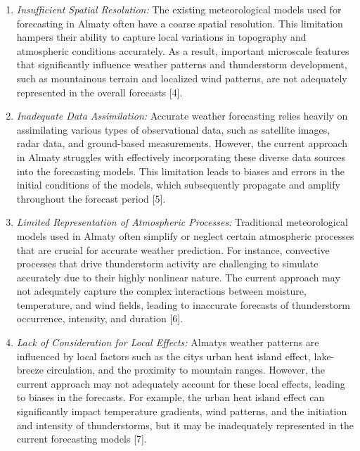 \begin{enumerate}
\def\labelenumi{\arabic{enumi})}
\item
  \emph{Insufficient Spatial Resolution:} The existing meteorological
  models used for forecasting in Almaty often have a coarse spatial
  resolution. This limitation hampers their ability to capture local
  variations in topography and atmospheric conditions accurately. As a
  result, important microscale features that significantly influence
  weather patterns and thunderstorm development, such as mountainous
  terrain and localized wind patterns, are not adequately represented in
  the overall forecasts {[}4{]}.
\item
  \emph{Inadequate Data Assimilation:} Accurate weather forecasting
  relies heavily on assimilating various types of observational data,
  such as satellite images, radar data, and ground-based measurements.
  However, the current approach in Almaty struggles with effectively
  incorporating these diverse data sources into the forecasting models.
  This limitation leads to biases and errors in the initial conditions
  of the models, which subsequently propagate and amplify throughout the
  forecast period {[}5{]}.
\item
  \emph{Limited Representation of Atmospheric Processes:} Traditional
  meteorological models used in Almaty often simplify or neglect certain
  atmospheric processes that are crucial for accurate weather
  prediction. For instance, convective processes that drive thunderstorm
  activity are challenging to simulate accurately due to their highly
  nonlinear nature. The current approach may not adequately capture the
  complex interactions between moisture, temperature, and wind fields,
  leading to inaccurate forecasts of thunderstorm occurrence, intensity,
  and duration {[}6{]}.
\item
  \emph{Lack of Consideration for Local Effects:}
  Almaty\textquotesingle s weather patterns are influenced by local
  factors such as the city\textquotesingle s urban heat island effect,
  lake-breeze circulation, and the proximity to mountain ranges.
  However, the current approach may not adequately account for these
  local effects, leading to biases in the forecasts. For example, the
  urban heat island effect can significantly impact temperature
  gradients, wind patterns, and the initiation and intensity of
  thunderstorms, but it may be inadequately represented in the current
  forecasting models {[}7{]}.
\end{enumerate}


